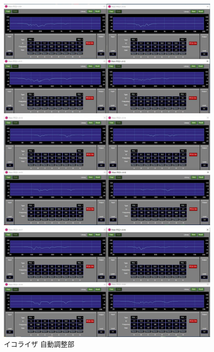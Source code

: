 \documentclass[11pt,a4j]{jreport}
\begin{document}
\begin{figure}[H]
  \begin{minipage}[b]{.5\linewidth}
    \centering
    \includegraphics[width=.9\linewidth]{images/experimentField/afcParameters/base02autoEQ3.jpg}
  \end{minipage}%
  \begin{minipage}[b]{.5\linewidth}
    \centering
    \includegraphics[width=.9\linewidth]{images/experimentField/afcParameters/base02autoEQ4.jpg}
  \end{minipage}

  \begin{minipage}[b]{1\linewidth}
    \centering
    \includegraphics[width=.45\linewidth]{images/experimentField/afcParameters/base02autoEQ5.jpg}
  \end{minipage}

  \centering
  \caption{イコライザ 自動調整部}
  \label{fig:イコライザ自動調整部}
\end{figure}
\end{document}
